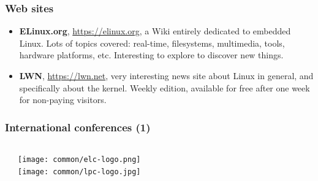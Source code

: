 \begin{frame}
  \frametitle{Web sites}
  \begin{itemize}
  \item {\bf ELinux.org}, \url{https://elinux.org}, a Wiki entirely
    dedicated to embedded Linux. Lots of topics covered: real-time,
    filesystems, multimedia, tools, hardware platforms,
    etc. Interesting to explore to discover new things.
  \item {\bf LWN}, \url{https://lwn.net}, very interesting news site
    about Linux in general, and specifically about the kernel. Weekly
    edition, available for free after one week for non-paying
    visitors.
  \end{itemize}
\end{frame}

\begin{frame}
  \frametitle{International conferences (1)}
  \begin{columns}
    \begin{itemize}
    
    
    \end{itemize}
    \begin{center}
      \texttt{[image: common/elc-logo.png]}\\
      \vspace{1cm}
      \texttt{[image: common/lpc-logo.jpg]}\\
    \end{center}
  \end{columns}
\end{frame}

